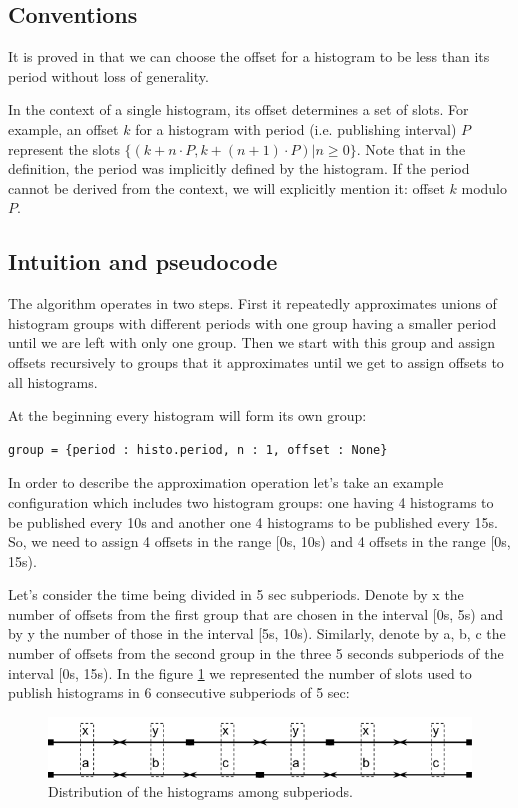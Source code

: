 \subsection{Conventions}

It is proved in \citep{goossens2003scheduling} that we can choose the offset for a histogram to be less than its period without loss of generality. 

In the context of a single histogram, its offset determines a set of slots. For example, an offset $k$ for a histogram with period (i.e. publishing interval) $P$ represent the slots $\{(k+n\cdot P, k+(n+1)\cdot P) | n \geq 0\}$. Note that in the definition, the period was implicitly defined by the histogram. If the period cannot be derived from the context, we will explicitly mention it: offset $k$ modulo $P$.

\subsection{Intuition and pseudocode}
\label{section:pseudocode_subperiod}
The algorithm operates in two steps. First it repeatedly approximates unions of histogram groups with different periods with one group having a smaller period until we are left with only one group. Then we start with this group and assign offsets recursively to groups that it approximates until we get to assign offsets to all histograms.

At the beginning every histogram will form its own group:
\begin{verbatim}
group = {period : histo.period, n : 1, offset : None}
\end{verbatim}
In order to describe the approximation operation let's take an example configuration which includes two histogram groups: one having 4 histograms to be published every 10s and another one 4 histograms to be published every 15s. So, we need to assign 4 offsets in the range [0s, 10s) and 4 offsets in the range [0s, 15s).

Let's consider the time being divided in 5 sec subperiods. Denote by x the number of offsets from the first group that are chosen in the interval [0s, 5s) and by y the number of those in the interval [5s, 10s). Similarly, denote by a, b, c the number of offsets from the second group in the three 5 seconds subperiods of the interval [0s, 15s). In the figure \ref{fig:subperiod} we represented the number of slots used to publish histograms in 6 consecutive subperiods of 5 sec:

\begin{figure}[ht!]
\centering
\includegraphics[scale=0.6]{Images/subperiod.png}
\caption{Distribution of the histograms among subperiods.}
\label{fig:subperiod}
\end{figure}

